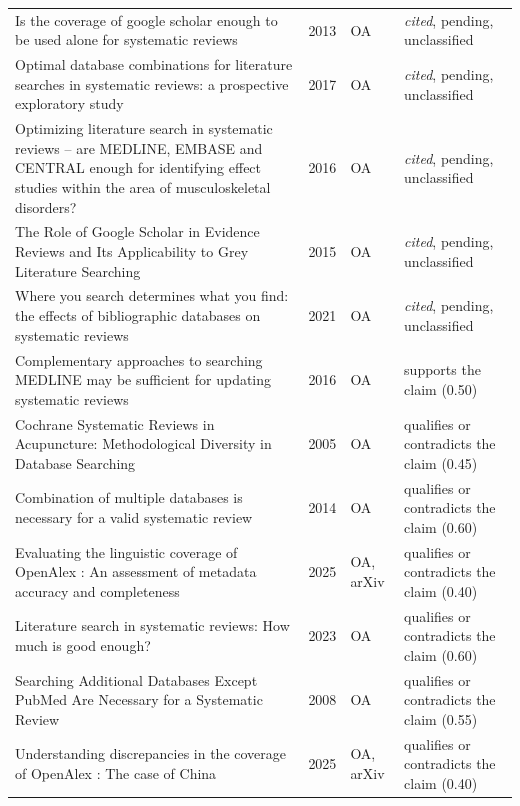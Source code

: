 \begin{longtable}{@{}%
  >{\raggedright\arraybackslash}p{}c%
  >{\raggedright\arraybackslash}p{}%
  >{\raggedright\arraybackslash}p{}@{}}
Is the coverage of google scholar enough to be used alone for systematic reviews & 2013 & OA & \emph{cited}, pending, unclassified \\
Optimal database combinations for literature searches in systematic reviews: a prospective exploratory study & 2017 & OA & \emph{cited}, pending, unclassified \\
Optimizing literature search in systematic reviews -- are MEDLINE, EMBASE and CENTRAL enough for identifying effect studies within the area of musculoskeletal disorders? & 2016 & OA & \emph{cited}, pending, unclassified \\
The Role of Google Scholar in Evidence Reviews and Its Applicability to Grey Literature Searching & 2015 & OA & \emph{cited}, pending, unclassified \\
Where you search determines what you find: the effects of bibliographic databases on systematic reviews & 2021 & OA & \emph{cited}, pending, unclassified \\
Complementary approaches to searching MEDLINE may be sufficient for updating systematic reviews & 2016 & OA & supports the claim (0.50) \\
Cochrane Systematic Reviews in Acupuncture: Methodological Diversity in Database Searching & 2005 & OA & qualifies or contradicts the claim (0.45) \\
Combination of multiple databases is necessary for a valid systematic review & 2014 & OA & qualifies or contradicts the claim (0.60) \\
Evaluating the linguistic coverage of OpenAlex : An assessment of metadata accuracy and completeness & 2025 & OA, arXiv & qualifies or contradicts the claim (0.40) \\
Literature search in systematic reviews: How much is good enough? & 2023 & OA & qualifies or contradicts the claim (0.60) \\
Searching Additional Databases Except PubMed Are Necessary for a Systematic Review & 2008 & OA & qualifies or contradicts the claim (0.55) \\
Understanding discrepancies in the coverage of OpenAlex : The case of China & 2025 & OA, arXiv & qualifies or contradicts the claim (0.40) \\
\end{longtable}
\endgroup
